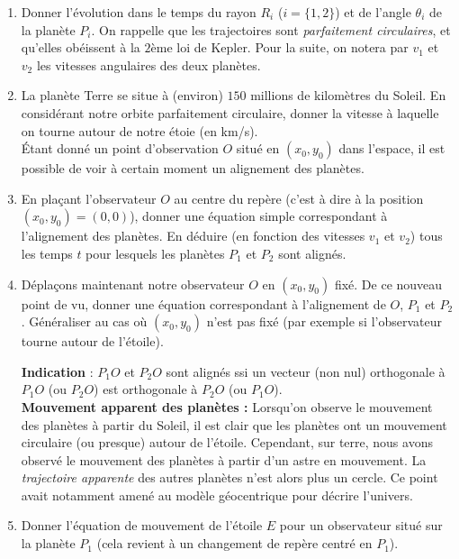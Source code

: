 \documentclass{../ficheTDTP}
\begin{document}
\begin{enumerate}

\item Donner l'évolution dans le temps du rayon $R_i$ ($i = \{1,2 \}$) et de l'angle $\theta_i$ de la planète $P_i$. On rappelle que les trajectoires sont \textit{parfaitement circulaires}, et qu'elles obéissent à la $2$ème loi de Kepler. Pour la suite, on notera par $v_1$ et $v_2$ les vitesses angulaires des deux planètes.

\item La planète Terre se situe à (environ) $150$ millions de kilomètres du Soleil. En considérant notre orbite parfaitement circulaire, donner la vitesse à laquelle on tourne autour de notre étoie (en km/s).\\

\noindent Étant donné un point d'observation $O$ situé en $(x_0,y_0)$ dans l'espace, il est possible de voir à certain moment un alignement des planètes.
	
\item En pla\c cant l'observateur $O$ au centre du repère (c'est à dire à la position $(x_0,y_0) = (0,0)$), donner une équation simple correspondant à l'alignement des planètes. En déduire (en fonction des vitesses $v_1$ et $v_2$) tous les temps $t$ pour lesquels les planètes $P_1$ et $P_2$ sont alignés.

\item Dépla\c cons maintenant notre observateur $O$ en $(x_0,y_0)$ fixé. De ce nouveau point de vu, donner une équation correspondant à l'alignement de $O$, $P_1$ et $P_2$. Généraliser au cas où $(x_0,y_0)$ n'est pas fixé (par exemple si l'observateur tourne autour de l'étoile).

\textbf{Indication} : $P_1 O$ et $P_2 O$ sont alignés ssi un vecteur (non nul) orthogonale à $P_1O$ (ou $P_2O$) est orthogonale à $P_2O$ (ou $P_1O$).\\


\noindent \textbf{Mouvement apparent des planètes : } Lorsqu'on observe le mouvement des planètes à partir du Soleil, il est clair que les planètes ont un mouvement circulaire (ou presque) autour de l'étoile. Cependant, sur terre, nous avons observé le mouvement des planètes à partir d'un astre en mouvement. La \textit{trajectoire apparente} des autres planètes n'est alors plus un cercle. Ce point avait notamment amené au modèle géocentrique pour décrire l'univers.\\

\item Donner l'équation de mouvement de l'étoile $E$ pour un observateur situé sur la planète $P_1$ (cela revient à un changement de repère centré en $P_1$).


\end{enumerate}
\end{document}
